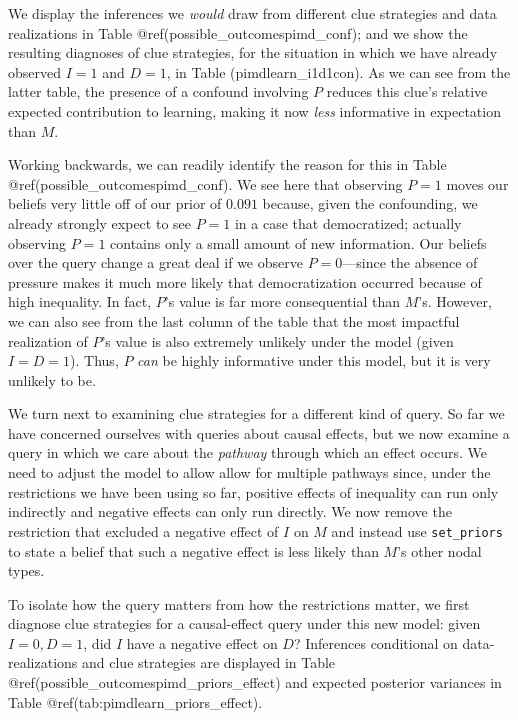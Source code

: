 \documentclass[12pt,]{book}
\begin{document}
We display the inferences we \emph{would} draw from different clue strategies and data realizations in Table @ref(possible\_outcomespimd\_conf); and we show the resulting diagnoses of clue strategies, for the situation in which we have already observed \(I=1\) and \(D=1\), in Table (pimdlearn\_i1d1con). As we can see from the latter table, the presence of a confound involving \(P\) reduces this clue's relative expected contribution to learning, making it now \emph{less} informative in expectation than \(M\).

Working backwards, we can readily identify the reason for this in Table @ref(possible\_outcomespimd\_conf). We see here that observing \(P=1\) moves our beliefs very little off of our prior of \(0.091\) because, given the confounding, we already strongly expect to see \(P=1\) in a case that democratized; actually observing \(P=1\) contains only a small amount of new information. Our beliefs over the query change a great deal if we observe \(P=0\)---since the absence of pressure makes it much more likely that democratization occurred because of high inequality. In fact, \(P\)'s value is far more consequential than \(M\)'s. However, we can also see from the last column of the table that the most impactful realization of \(P\)'s value is also extremely unlikely under the model (given \(I=D=1\)). Thus, \(P\) \emph{can} be highly informative under this model, but it is very unlikely to be.

We turn next to examining clue strategies for a different kind of query. So far we have concerned ourselves with queries about causal effects, but we now examine a query in which we care about the \emph{pathway} through which an effect occurs. We need to adjust the model to allow allow for multiple pathways since, under the restrictions we have been using so far, positive effects of inequality can run only indirectly and negative effects can only run directly. We now remove the restriction that excluded a negative effect of \(I\) on \(M\) and instead use \texttt{set\_priors} to state a belief that such a negative effect is less likely than \(M\)'s other nodal types.

To isolate how the query matters from how the restrictions matter, we first diagnose clue strategies for a causal-effect query under this new model: given \(I=0, D=1\), did \(I\) have a negative effect on \(D\)? Inferences conditional on data-realizations and clue strategies are displayed in Table @ref(possible\_outcomespimd\_priors\_effect) and expected posterior variances in Table @ref(tab:pimdlearn\_priors\_effect).
\end{document}
